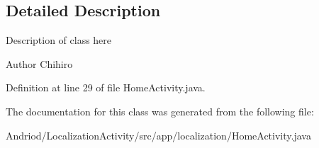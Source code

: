 \subsection{Detailed Description}
Description of class here \begin{DoxyAuthor}{Author}
Chihiro 
\end{DoxyAuthor}


Definition at line 29 of file Home\-Activity.\-java.



The documentation for this class was generated from the following file\-:\begin{DoxyCompactItemize}
\item 
Andriod/\-Localization\-Activity/src/app/localization/Home\-Activity.\-java\end{DoxyCompactItemize}
